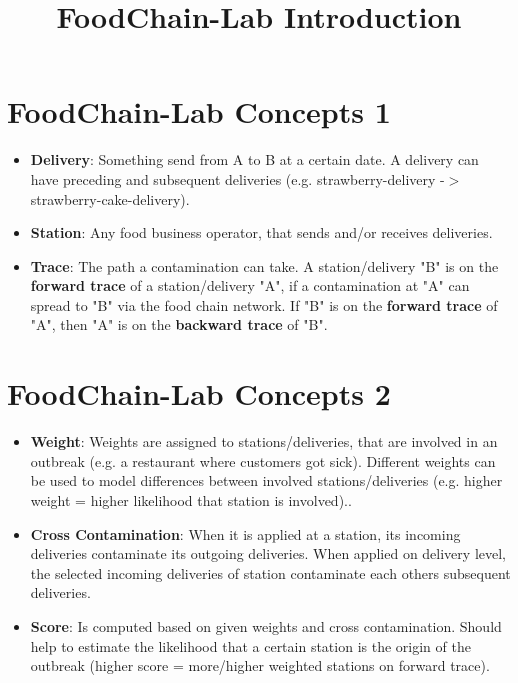 \documentclass{beamer}
\title{FoodChain-Lab Introduction}
\date{}
\begin{document}
\maketitle

\section{FoodChain-Lab Concepts 1}
\begin{frame}
	\begin{itemize}
		\item \textbf{Delivery}: Something send from A to B at a certain date. A delivery can have preceding and subsequent deliveries (e.g. strawberry-delivery -$>$ strawberry-cake-delivery).
		\item \textbf{Station}: Any food business operator, that sends and/or receives deliveries.
		\item \textbf{Trace}: The path a contamination can take. A station/delivery "B" is on the \textbf{forward trace} of a station/delivery "A", if a contamination at "A" can spread to "B" via the food chain network. If "B" is on the \textbf{forward trace} of "A", then "A" is on the \textbf{backward trace} of "B".
	\end{itemize}
\end{frame}

\section{FoodChain-Lab Concepts 2}
\begin{frame}
	\begin{itemize}
		\item \textbf{Weight}: Weights are assigned to stations/deliveries, that are involved in an outbreak (e.g. a restaurant where customers got sick). Different weights can be used to model differences between involved stations/deliveries (e.g. higher weight = higher likelihood that station is involved)..
		\item \textbf{Cross Contamination}: When it is applied at a station, its incoming deliveries contaminate its outgoing deliveries. When applied on delivery level, the selected incoming deliveries of station contaminate each others subsequent deliveries.
		\item \textbf{Score}: Is computed based on given weights and cross contamination. Should help to estimate the likelihood that a certain station is the origin of the outbreak (higher score = more/higher weighted stations on forward trace).
	\end{itemize}
\end{frame}
\end{document}
